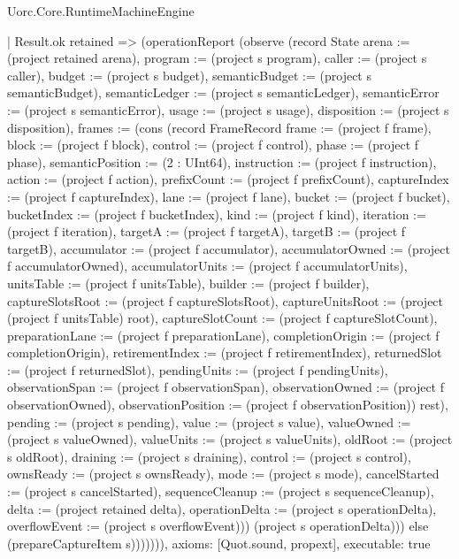 \begin{lexlean}{Uorc.Core.RuntimeMachineEngine}
\begin{semanticmodule}
{            | Result.ok retained => (operationReport (observe (record State {arena := (project retained arena), program := (project s program), caller := (project s caller), budget := (project s budget), semanticBudget := (project s semanticBudget), semanticLedger := (project s semanticLedger), semanticError := (project s semanticError), usage := (project s usage), disposition := (project s disposition), frames := (cons (record FrameRecord {frame := (project f frame), block := (project f block), control := (project f control), phase := (project f phase), semanticPosition := (2 : UInt64), instruction := (project f instruction), action := (project f action), prefixCount := (project f prefixCount), captureIndex := (project f captureIndex), lane := (project f lane), bucket := (project f bucket), bucketIndex := (project f bucketIndex), kind := (project f kind), iteration := (project f iteration), targetA := (project f targetA), targetB := (project f targetB), accumulator := (project f accumulator), accumulatorOwned := (project f accumulatorOwned), accumulatorUnits := (project f accumulatorUnits), unitsTable := (project f unitsTable), builder := (project f builder), captureSlotsRoot := (project f captureSlotsRoot), captureUnitsRoot := (project (project f unitsTable) root), captureSlotCount := (project f captureSlotCount), preparationLane := (project f preparationLane), completionOrigin := (project f completionOrigin), retirementIndex := (project f retirementIndex), returnedSlot := (project f returnedSlot), pendingUnits := (project f pendingUnits), observationSpan := (project f observationSpan), observationOwned := (project f observationOwned), observationPosition := (project f observationPosition)}) rest), pending := (project s pending), value := (project s value), valueOwned := (project s valueOwned), valueUnits := (project s valueUnits), oldRoot := (project s oldRoot), draining := (project s draining), control := (project s control), ownsReady := (project s ownsReady), mode := (project s mode), cancelStarted := (project s cancelStarted), sequenceCleanup := (project s sequenceCleanup), delta := (project retained delta), operationDelta := (project s operationDelta), overflowEvent := (project s overflowEvent)})) (project s operationDelta))) else (prepareCaptureItem s))))))),
  axioms: [Quot.sound, propext],
  executable: true
}


\end{semanticmodule}
\end{lexlean}

